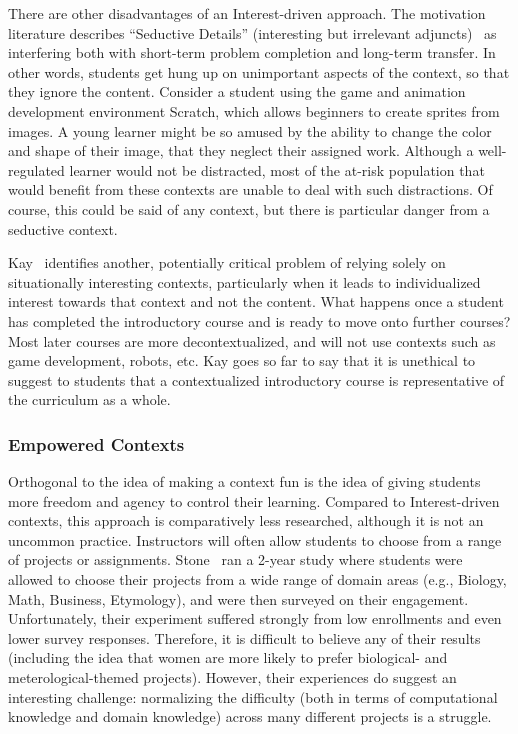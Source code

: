 There are other disadvantages of an Interest-driven approach.
The motivation literature describes ``Seductive Details'' (interesting but irrelevant adjuncts)~\cite{harp1998seductive} as interfering both with short-term problem completion and long-term transfer.
In other words, students get hung up on unimportant aspects of the context, so that they ignore the content.
Consider a student using the game and animation development environment Scratch, which allows beginners to create sprites from images.
A young learner might be so amused by the ability to change the color and shape of their image, that they neglect their assigned work.
Although a well-regulated learner would not be distracted, most of the at-risk population that would benefit from these contexts are unable to deal with such distractions.
Of course, this could be said of any context, but there is particular danger from a seductive context.

Kay~\cite{Kay:2011} identifies another, potentially critical problem of relying solely on situationally interesting contexts, particularly when it leads to individualized interest towards that context and not the content. 
What happens once a student has completed the introductory course and is ready to move onto further courses?
Most later courses are more decontextualized, and will not use contexts such as game development, robots, etc.
Kay goes so far to say that it is unethical to suggest to students that a contextualized introductory course is representative of the curriculum as a whole.

\subsubsection{Empowered Contexts}

Orthogonal to the idea of making a context fun is the idea of giving students more freedom and agency to control their learning.
Compared to Interest-driven contexts, this approach is comparatively less researched, although it is not an uncommon practice. Instructors will often allow students to choose from a range of projects or assignments.
Stone~\cite{EmpowermentInProjects} ran a 2-year study where students were allowed to choose their projects from a wide range of domain areas (e.g., Biology, Math, Business, Etymology), and were then surveyed on their engagement.
Unfortunately, their experiment suffered strongly from low enrollments and even lower survey responses. Therefore, it is difficult to believe any of their results (including the idea that women are more likely to prefer biological- and meterological-themed projects).
However, their experiences do suggest an interesting challenge: normalizing the difficulty (both in terms of computational knowledge and domain knowledge) across many different projects is a struggle.

